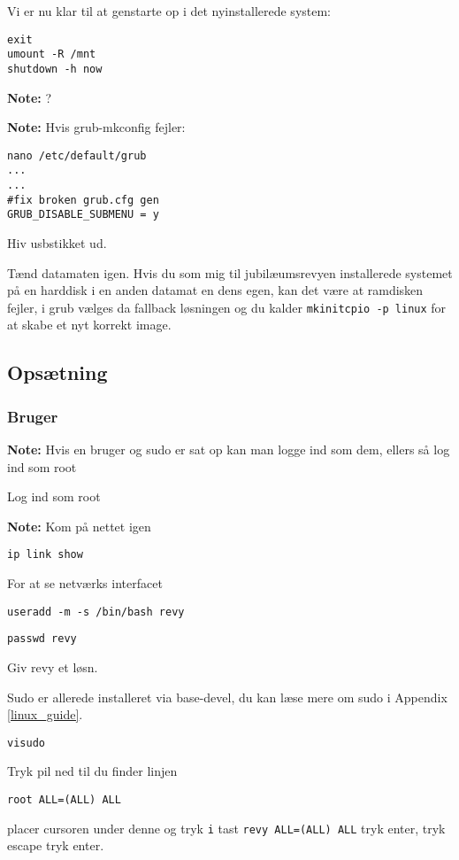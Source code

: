\documentclass[10pt,a4paper,danish]{article}
\newcommand{\note}[1]{\begin{mdframed}[style=note]\textbf{Note:}
    #1\end{mdframed}}
\newcommand{\code}[1]{\colorbox{verbgray}{\texttt{#1}}}
\begin{document}
Vi er nu klar til at genstarte op i det nyinstallerede system:
\begin{verbatim}
exit
umount -R /mnt
shutdown -h now
\end{verbatim}
\note{?}
\begin{mdframed}[style=note]\textbf{Note:}
  Hvis grub-mkconfig fejler:
\begin{verbatim}
nano /etc/default/grub
...
...
#fix broken grub.cfg gen
GRUB_DISABLE_SUBMENU = y
\end{verbatim}
\end{mdframed}

Hiv usbstikket ud.

Tænd datamaten igen.
Hvis du som mig til jubilæumsrevyen installerede systemet på en harddisk i en
anden datamat en dens egen, kan det være at ramdisken fejler, i grub vælges da
fallback løsningen og du kalder \code{mkinitcpio -p linux} for at skabe et nyt
korrekt image.

\subsection{Opsætning}
\subsubsection{Bruger}
\note{Hvis en bruger og sudo er sat op kan man logge ind som dem, ellers så log
  ind som root}

Log ind som root

\note{Kom på nettet igen}

\begin{verbatim}
ip link show
\end{verbatim}
For at se netværks interfacet

\begin{verbatim}
useradd -m -s /bin/bash revy
\end{verbatim}
\begin{verbatim}
passwd revy
\end{verbatim}
Giv revy et løsn.

Sudo er allerede installeret via base-devel, du kan læse mere om sudo i Appendix \ref{linux_guide}.
\begin{verbatim}
visudo
\end{verbatim}
Tryk pil ned til du finder linjen
\begin{verbatim}
root ALL=(ALL) ALL
\end{verbatim}
placer cursoren under denne og tryk \code{i}
tast \texttt{revy ALL=(ALL) ALL} tryk enter, tryk escape
tryk  enter.
\end{document}
